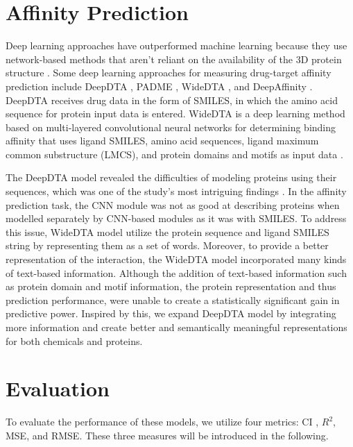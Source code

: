 \section{Affinity Prediction}
Deep learning approaches have outperformed machine learning because they use network-based methods that aren't reliant on the availability of the 3D protein structure \cite{lounkine2012large}. Some deep learning approaches for measuring drug-target affinity prediction include DeepDTA \cite{ozturk2018deepdta}, PADME \cite{feng2018padme}, WideDTA \cite{ozturk2019widedta}, and DeepAffinity \cite{karimi2019deepaffinity}. DeepDTA receives drug data in the form of SMILES, in which the amino acid sequence for protein input data is entered. WideDTA is a deep learning method based on multi-layered convolutional neural networks for determining binding affinity that uses ligand SMILES, amino acid sequences, ligand maximum common substructure (LMCS), and protein domains and motifs as input data \cite{gao2018interpretable}.

The DeepDTA model revealed the difficulties of modeling proteins using their sequences, which was one of the study's most intriguing findings \cite{ozturk2018deepdta}. In the affinity prediction task, the CNN module was not as good at describing proteins when modelled separately by CNN-based modules as it was with SMILES. To address this issue, WideDTA model utilize the protein sequence and ligand SMILES string by representing them as a set of words. Moreover, to provide a better representation of the interaction, the WideDTA model incorporated many kinds of text-based information. Although the addition of text-based information such as protein domain and motif information, the protein representation and thus prediction performance, were unable to create a statistically significant gain in predictive power. Inspired by this, we expand DeepDTA model by integrating more information and create better and semantically meaningful representations for both chemicals and proteins.


\section{Evaluation}

To evaluate the performance of these models, we utilize four metrics: CI \cite{gonen2005concordance}, $R^2$, MSE, and RMSE. These three measures will be introduced in the following.

